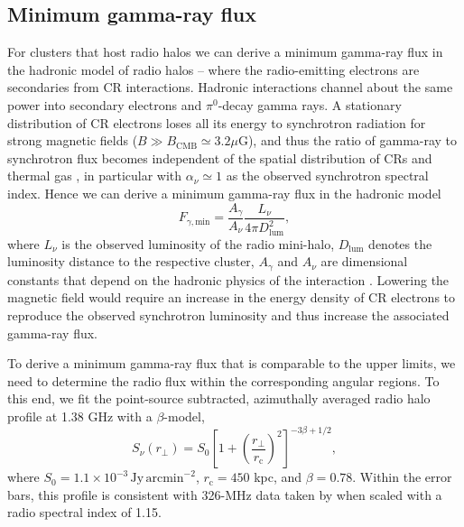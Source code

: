 \documentclass[12pt,manuscript]{aastex}
\newcommand{\rmn}{\mathrm}
\newcommand{\dps}{\displaystyle}
\begin{document}
\subsection{Minimum gamma-ray flux}
\label{sec:Fmin}
For clusters that host radio halos we can derive a minimum gamma-ray flux in the hadronic
model of radio halos -- where the radio-emitting electrons are secondaries from CR interactions. 
Hadronic interactions channel about the same power into secondary electrons and $\pi^{0}$-decay
gamma rays. A stationary distribution of CR electrons loses all its energy to
synchrotron radiation for strong magnetic fields ($B \gg B_{\rmn{CMB}} \simeq 3.2 \mu$G), and thus the
ratio of gamma-ray to synchrotron flux becomes independent of the spatial distribution of CRs and
thermal gas \citep{article:Voelk:1989, article:Pohl:1994, article:Pfrommer:2008}, in particular with
$\alpha_{\nu}\simeq 1$ as the observed synchrotron spectral index.  Hence we can derive a minimum
gamma-ray flux in the hadronic model
\begin{equation}
\label{eq:Fmin}
F_{\gamma,\rmn{min}} = \frac{\dps A_{\gamma}}{\dps A_{\nu}}\frac{\dps L_{\nu}}{\dps 4\pi D_{\rmn{lum}}^{2}},
\end{equation}
where $L_{\nu}$ is the observed luminosity of the radio mini-halo, $D_{\rmn{lum}}$ denotes the
luminosity distance to the respective cluster, $A_\gamma$ and $A_\nu$ are dimensional constants
that depend on the hadronic physics of the interaction \citep{article:Pfrommer:2008,
Pfrommer_etal:2008}. Lowering the magnetic field would require an increase in the energy density of
CR electrons to reproduce the observed synchrotron luminosity and thus increase the associated
gamma-ray flux.

To derive a minimum gamma-ray flux that is comparable to the upper limits, we need to determine the
radio flux within the corresponding angular regions. To this end, we fit the point-source
subtracted, azimuthally averaged radio halo profile at 1.38 GHz \citep{article:Deiss_etal:1997}
with a $\beta$-model,
\begin{equation}
\label{beta}
 S_{\nu} (r_{\bot})= S_{0} \left[ 1 + \left( \frac{r_{\bot}}{r_{\rmn{c}}}\right)^{2}\right]^{-3\beta + 1/2},
\end{equation}
where $S_{0} = 1.1 \times 10^{-3}\,\rmn{Jy\,arcmin}^{-2}$, $r_{\rmn{c}} = 450$ kpc, and
$\beta = 0.78$.  Within the error bars, this profile is consistent with 326-MHz data taken by
\citet{article:Govoni_etal:2001} when scaled with a radio spectral index of 1.15. 
\end{document}
